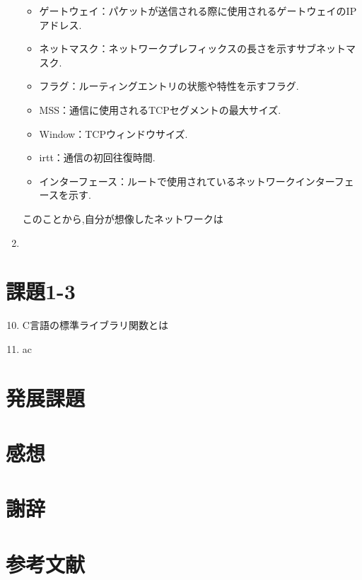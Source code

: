 \documentclass[dvipdfmx]{jarticle}
\begin{document}
\begin{enumerate}
\begin{itemize}
        \item ゲートウェイ：パケットが送信される際に使用されるゲートウェイのIPアドレス.
        \item ネットマスク：ネットワークプレフィックスの長さを示すサブネットマスク.
        \item フラグ：ルーティングエントリの状態や特性を示すフラグ.
        \item MSS：通信に使用されるTCPセグメントの最大サイズ.
        \item Window：TCPウィンドウサイズ.
        \item irtt：通信の初回往復時間.
        \item インターフェース：ルートで使用されているネットワークインターフェースを示す.
    \end{itemize}
    このことから,自分が想像したネットワークは
    \item 
\end{enumerate}
\section{課題1-3}
\begin{enumerate}
\setcounter{enumi}{9}
    \item C言語の標準ライブラリ関数とは
    \item ac
\end{enumerate}
\section{発展課題}
\section{感想}
\section{謝辞}
\section{参考文献}
\end{document}
